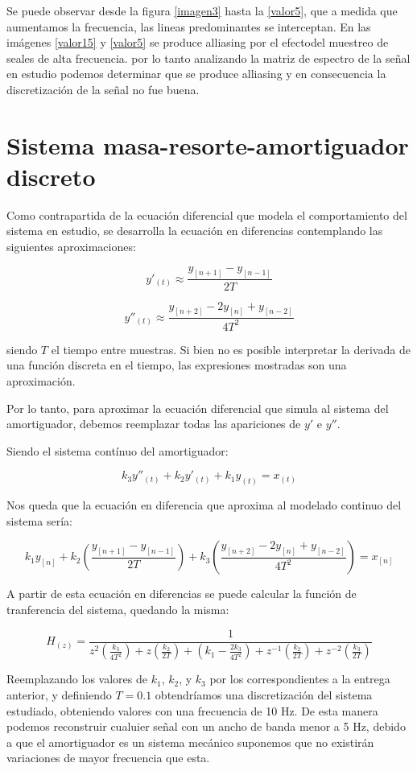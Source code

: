 \documentclass{article}
\begin{document}
	Se puede observar desde la figura \ref{imagen3} hasta la \ref{valor5}, que a medida que aumentamos la frecuencia, las lineas predominantes se interceptan. En las imágenes \ref{valor15} y \ref{valor5} se produce alliasing por el efectodel muestreo de seales de alta frecuencia. por lo tanto analizando la matriz de espectro de la señal en estudio podemos determinar que se produce alliasing y en consecuencia la discretización de la señal no fue buena.

\section{Sistema masa-resorte-amortiguador discreto}

Como contrapartida de la ecuación diferencial que modela el comportamiento del sistema en estudio, se desarrolla la ecuación en diferencias contemplando las siguientes aproximaciones:

$$y'_{(t)} \approx \frac{y_{[n+1]}-y_{[n-1]}}{2T}$$

$$y''_{(t)} \approx \frac{y_{[n+2]} - 2 y_{[n]} + y_{[n-2]}}{4T^2}$$

siendo $T$ el tiempo entre muestras. Si bien no es posible interpretar la derivada de una función discreta en el tiempo, las expresiones mostradas son una aproximación.


Por lo tanto, para aproximar la ecuación diferencial que simula al sistema del amortiguador, debemos reemplazar todas las apariciones de $y'$ e $y''$. 

Siendo el sistema contínuo del amortiguador:

$$k_3 y''_{(t)} + k_2 y'_{(t)} + k_1 y_{(t)} = x_{(t)}$$

Nos queda que la ecuación en diferencia que aproxima al modelado continuo del sistema sería:

$$k_1 y_{[n]} + k_2 \left(\frac{y_{[n+1]}-y_{[n-1]}}{2T}\right) + k_3 \left(\frac{y_{[n+2]} - 2 y_{[n]} + y_{[n-2]}}{4T^2}\right)= x_{[n]}$$

A partir de esta ecuación en diferencias se puede calcular la función de tranferencia del sistema, quedando la misma:

$$H_{(z)} = \frac{1}{z^2 \left(\frac{k_3}{4T^2}\right) + z \left(\frac{k_2}{2T}\right) + \left(k_1-\frac{2k_3}{4T^2}\right) + z^{-1} \left(\frac{k_2}{2T}\right) + z^{-2} \left(\frac{k_3}{2T}\right)} $$


Reemplazando los valores de $k_1$, $k_2$, y $k_3$ por los correspondientes a la entrega anterior, y definiendo $T=0.1$ obtendríamos una discretización del sistema estudiado, obteniendo valores con una frecuencia de 10 Hz. De esta manera podemos reconstruir cualuier señal con un ancho de banda menor a 5 Hz, debido a que el amortiguador es un sistema mecánico suponemos que  no existirán variaciones de mayor frecuencia que esta.
\end{document}
